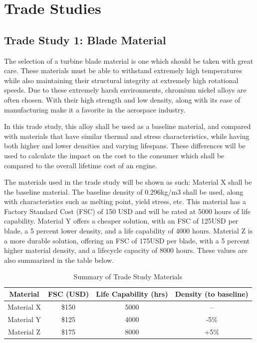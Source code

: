 \documentclass[12pt, letter]{report}
\begin{document}
\chapter{Trade Studies}
\section{Trade Study 1: Blade Material}

The selection of a turbine blade material is one which should be taken with great care. These materials must be able to withstand extremely high temperatures while also maintaining their structural integrity at extremely high rotational speeds. Due to these extremely harsh environments, chromium nickel alloys are often chosen. With their high strength and low density, along with its ease of manufacturing make it a favorite in the aerospace industry.

In this trade study, this alloy shall be used as a baseline material, and compared with materials that have similar thermal and stress characteristics, while having both higher and lower densities and varying lifespans. These differences will be used to calculate the impact on the cost to the consumer which shall be compared to the overall lifetime cost of an engine.

The materials used in the trade study will be shown as such: Material X shall be the baseline material. The baseline density of 0.296kg/m3 shall be used, along with characteristics such as melting point, yield stress, etc. This material has a Factory Standard Cost (FSC) of 150 USD and will be rated at 5000 hours of life capability. Material Y offers a cheaper solution, with an FSC of 125USD per blade, a 5 percent lower density, and a life capability of 4000 hours. Material Z is a more durable solution, offering an FSC of 175USD per blade, with a 5 percent higher material density, and a lifecycle capacity of 8000 hours. These values are also summarized in the table below.
\begin{table}[H]
\centering
\caption{Summary of Trade Study Materials}
\begin{tabular}{|c|c|c|c|}
\hline
\textbf{Material} & \textbf{FSC (USD)} & \textbf{Life Capability (hrs)} & \textbf{Density (to baseline)} \\ \hline
Material X        & \$150               & 5000                            & --                              \\ \hline
Material Y        & \$125               & 4000                            & -5\%                            \\ \hline
Material Z        & \$175               & 8000                            & +5\%                            \\ \hline
\end{tabular}

\end{table}
\end{document}
